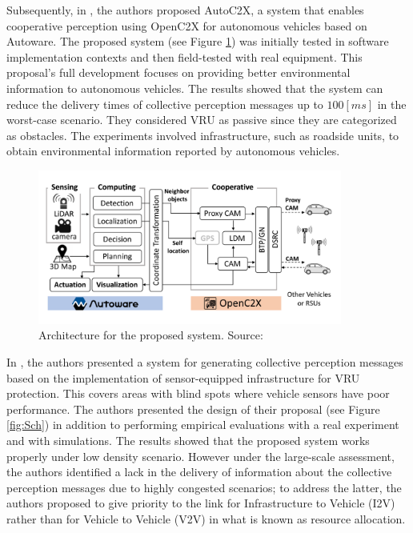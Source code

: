 Subsequently, in \cite{Tsukada2020}, the authors proposed AutoC2X, a system that enables cooperative perception using OpenC2X for autonomous vehicles based on Autoware. The proposed system (see Figure \ref{fig:Tsu}) was initially tested in software implementation contexts and then field-tested with real equipment. This proposal's full development focuses on providing better environmental information to autonomous vehicles. The results showed that the system can reduce the delivery times of collective perception messages up to $100 [ms]$ in the worst-case scenario. They considered VRU as passive since they are categorized as obstacles. The experiments involved infrastructure, such as roadside units, to obtain environmental information reported by autonomous vehicles. 

\begin{figure}[ht!]
    \centering
    \includegraphics[width=10cm]{FIGURES/Fig7.png}
    \caption{Architecture for the proposed system. Source: \cite{Tsukada2020}}
    \label{fig:Tsu}
\end{figure}

In \cite{Schiegg2021}, the authors presented a system for generating collective perception messages based on the implementation of sensor-equipped infrastructure for VRU protection. This covers areas with blind spots where vehicle sensors have poor performance. The authors presented the design of their proposal (see Figure \ref{fig:Sch}) in addition to performing empirical evaluations with a real experiment and with simulations. The results showed that the proposed system works properly under low density scenario. However under the large-scale assessment, the authors identified a lack in the delivery of information about the collective perception messages due to highly congested scenarios; to address the latter, the authors proposed to give priority to the link for Infrastructure to Vehicle (I2V) rather than for Vehicle to Vehicle (V2V) in what is known as resource allocation.


